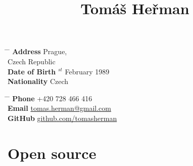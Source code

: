 \documentclass[10pt]{article} %
\begin{document}

\title{Tomáš Heřman} %


\parbox{0.5\textwidth}{ %
\begin{tabbing} %
\hspace{3cm} \= \hspace{4cm} \= \kill %
{\bf {} Address} \>Prague,\\ %
\> Czech Republic \\ %
{\bf {} Date of Birth} $^{st}$ February 1989 \\ %
{\bf {} Nationality} \> Czech %
\end{tabbing}}
\hfill %
\parbox{0.5\textwidth}{ %
\begin{tabbing} %
\hspace{3cm} \= \hspace{4cm} \= \kill %
{\bf {} Phone} \> +420 728 466 416 \\ %
{\bf {} Email} \> \href{mailto:tomas.herman@gmail.com}{tomas.herman@gmail.com} \\ %
{\bf {} GitHub} \> \href{https://github.com/tomasherman}{github.com/tomasherman}
\end{tabbing}}


\section{Open source}

\end{document}

